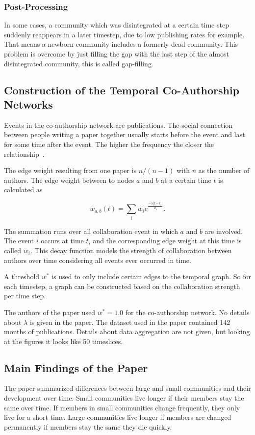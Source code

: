 \documentclass[runningheads,a4paper]{llncs}
\begin{document}
\subsubsection{Post-Processing}
In some cases, a community which was disintegrated at a certain time step suddenly reappears in a later timestep, due to low publishing rates for example.
That means a newborn community includes a formerly dead community.
This problem is overcome by just filling the gap with the last step of the almost disintegrated community, this is called gap-filling.

\subsection{Construction of the Temporal Co-Authorship Networks}
\label{evolution-constr}
Events in the co-authorship network are publications.
The social connection between people writing a paper together usually starts before the event and last for some time after the event. The higher the frequency the closer the relationship~\cite{ramasco2006social}.

The edge weight resulting from one paper is $n/(n-1)$ with $n$ as the number of authors. The edge weight between to nodes $a$ and $b$ at a certain time $t$ is calculated as

$$w_{a,b}(t)= \sum_{i}^{} w_i e^{\frac{-\lambda \left|t-t_i\right|}{w_i}}.$$

The summation runs over all collaboration event in which $a$ and $b$ are involved. The event $i$ occurs at time $t_i$ and the corresponding edge weight at this time is called $w_i$. This decay function models the strength of collaboration between authors over time considering all events ever occurred in time.

A threshold $w^*$ is used to only include certain edges to the temporal graph. So for each timestep, a graph can be constructed based on the collaboration strength per time step.

The authors of the paper used $w^*=1.0$ for the co-authorship network.
No details about $\lambda$ is given in the paper.
The dataset used in the paper contained 142 months of publications. Details about data aggregation are not given, but looking at the figures it looks like 50 timeslices.

\subsection{Main Findings of the Paper}
\label{evolution-findings}
The paper summarized differences between large and small communities and their development over time. Small communities live longer if their members stay the same over time. If members in small communities change frequently, they only live for a short time. Large communities live longer if members are changed permanently if members stay the same they die quickly.
\end{document}
